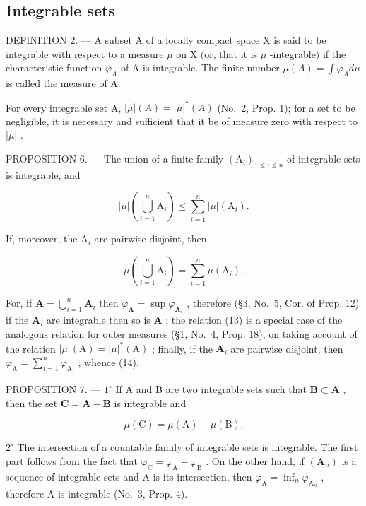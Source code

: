 \subsection{Integrable sets}

DEFINITION 2. --- A subset A of a locally compact space X is said to be integrable with respect to a measure \(\mu\) on X (or, that it is \(\mu\) -integrable) if the characteristic function \(\varphi_{A}\) of A is integrable. The finite number \(\mu(A) = \int \varphi_{A} d\mu\) is called the measure of A.

For every integrable set A, \(|\mu|(A) = |\mu|^{*}(A)\) (No.~2, Prop. 1); for a set to be negligible, it is necessary and sufficient that it be of measure zero with respect to \(|\mu|\) .

PROPOSITION 6. --- The union of a finite family \((\mathrm{A}_{i})_{1\leqslant i\leqslant n}\) of integrable sets is integrable, and

\[
| \mu | \left(\bigcup_ {i = 1} ^ {n} \mathrm{A} _ {i}\right) \leqslant \sum_ {i = 1} ^ {n} | \mu | (\mathrm{A} _ {i}).\tag{13}
\]

If, moreover, the \(\mathrm{A}_i\) are pairwise disjoint, then

\[
\mu \left(\bigcup_ {i = 1} ^ {n} \mathrm{A} _ {i}\right) = \sum_ {i = 1} ^ {n} \mu (\mathrm{A} _ {i}).\tag{14}
\]

For, if \(\mathbf{A} = \bigcup_{i=1}^{n} \mathbf{A}_i\) then \(\varphi_{\mathbf{A}} = \sup \varphi_{\mathbf{A}_i}\) , therefore (§3, No.~5, Cor. of Prop. 12) if the \(\mathbf{A}_i\) are integrable then so is \(\mathbf{A}\) ; the relation (13) is a special case of the analogous relation for outer measures (§1, No.~4, Prop. 18), on taking account of the relation \(|\mu|(\mathrm{A}) = |\mu|^*(\mathrm{A})\) ; finally, if the \(\mathbf{A}_i\) are pairwise disjoint, then \(\varphi_{\mathrm{A}} = \sum_{i=1}^{n} \varphi_{\mathrm{A}_i}\) , whence (14).

PROPOSITION 7. --- \(1^{\circ}\) If A and B are two integrable sets such that \(\mathbf{B} \subset \mathbf{A}\) , then the set \(\mathbf{C} = \mathbf{A} - \mathbf{B}\) is integrable and

\[
\mu (\mathrm{C}) = \mu (\mathrm{A}) - \mu (\mathrm{B}).\tag{15}
\]

\(2^{\circ}\) The intersection of a countable family of integrable sets is integrable. The first part follows from the fact that \(\varphi_{\mathrm{C}} = \varphi_{\mathrm{A}} - \varphi_{\mathrm{B}}\) . On the other hand, if \((\mathbf{A}_n)\) is a sequence of integrable sets and A is its intersection, then \(\varphi_{\mathrm{A}} = \inf_{n} \varphi_{\mathrm{A}_n}\) , therefore A is integrable (No.~3, Prop. 4).

